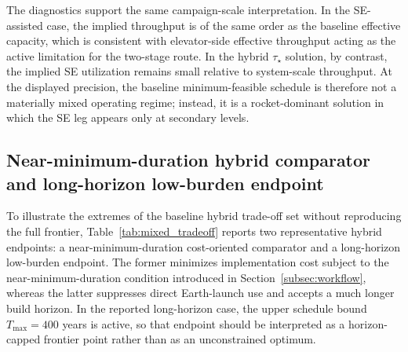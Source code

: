 \documentclass[12pt]{article}
\begin{document}
The diagnostics support the same campaign-scale interpretation. In the SE-assisted case, the implied throughput is of the same order as the baseline effective capacity, which is consistent with elevator-side effective throughput acting as the active limitation for the two-stage route. In the hybrid $\tau_\star$ solution, by contrast, the implied SE utilization remains small relative to system-scale throughput. At the displayed precision, the baseline minimum-feasible schedule is therefore not a materially mixed operating regime; instead, it is a rocket-dominant solution in which the SE leg appears only at secondary levels.

\subsection{Near-minimum-duration hybrid comparator and long-horizon low-burden endpoint}
\label{subsec:tradeoff_endpoints}

To illustrate the extremes of the baseline hybrid trade-off set without reproducing the full frontier, Table~\ref{tab:mixed_tradeoff} reports two representative hybrid endpoints: a near-minimum-duration cost-oriented comparator and a long-horizon low-burden endpoint. The former minimizes implementation cost subject to the near-minimum-duration condition introduced in Section~\ref{subsec:workflow}, whereas the latter suppresses direct Earth-launch use and accepts a much longer build horizon. In the reported long-horizon case, the upper schedule bound $T_{\max}=400$ years is active, so that endpoint should be interpreted as a horizon-capped frontier point rather than as an unconstrained optimum.

\begin{table}[htbp]
	\centering
	\caption{Representative hybrid endpoints under baseline conditions.
		The near-minimum-duration comparator minimizes cost subject to $\tau \le 1.05\,\tau_\star$, whereas the long-horizon low-burden endpoint is reported at the active upper horizon bound.
		All totals are computed on $[0,T_b+1]$.}
	\label{tab:mixed_tradeoff}
	
	\small
	\setlength{\tabcolsep}{3pt}
	\renewcommand{\arraystretch}{1.1}
	
\end{table}
\end{document}
